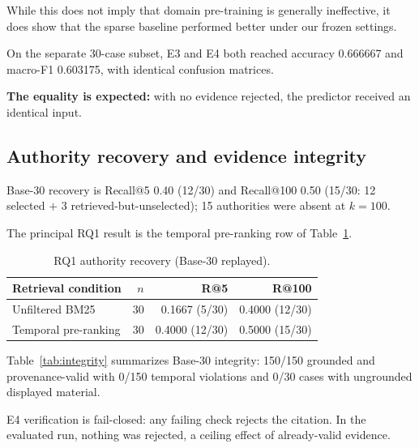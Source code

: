 \documentclass[conference]{IEEEtran}
\begin{document}
While this does not imply that domain pre-training is generally ineffective, it does show that the sparse baseline performed better under our frozen settings.

On the separate 30-case subset, E3 and E4 both
reached accuracy 0.666667 and macro-F1 0.603175, with identical confusion matrices.

\textbf{The equality is expected:} with no evidence rejected, the predictor received an identical
input.

\subsection{Authority recovery and evidence integrity}

Base-30 recovery is Recall@5 0.40 (12/30) and Recall@100 0.50 (15/30: 12
selected $+$ 3 retrieved-but-unselected); 15 authorities were absent at
$k{=}100$.

The principal RQ1 result is the temporal pre-ranking row of Table~\ref{tab:rq1strata}.


\begin{table}[t]
\caption{RQ1 authority recovery (Base-30 replayed).}
\label{tab:rq1strata}
\centering
\footnotesize
\setlength{\tabcolsep}{6pt}
\begin{tabular}{lrrr}
\toprule
\textbf{Retrieval condition} & \textbf{$n$} & \textbf{R@5} & \textbf{R@100} \\
\midrule
Unfiltered BM25 & 30 & 0.1667 (5/30) & 0.4000 (12/30) \\
Temporal pre-ranking & 30 & 0.4000 (12/30) & 0.5000 (15/30) \\
\bottomrule
\end{tabular}
\end{table}

Table~\ref{tab:integrity} summarizes Base-30 integrity:
150/150 grounded and provenance-valid with 0/150 temporal violations and 0/30
cases with ungrounded displayed material.


E4 verification is fail-closed: any failing check rejects the citation. In the evaluated run, nothing was rejected, a ceiling effect of already-valid evidence.
\end{document}
